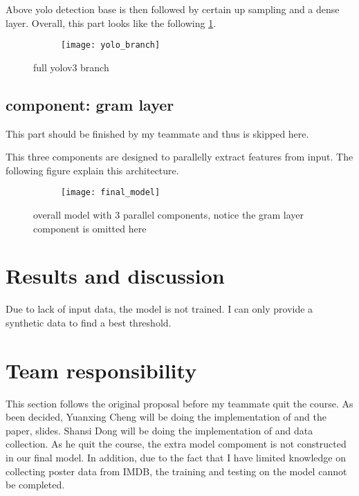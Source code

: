 \documentclass{article}
\begin{document}
Above yolo detection base is then followed by certain up sampling and a dense layer. Overall, this part looks like the following \ref{pic:overall_model}.

\begin{figure}[h!]
    \centering
    \begin{subfigure}{.70\textwidth}
        \centering
        \texttt{[image: yolo\_branch]}
    \end{subfigure}
    \caption{full yolov3 branch}\label{pic:overall_model}
\end{figure}


\subsection{component: gram layer}

This part should be finished by my teammate and thus is skipped here.

This three components are designed to parallelly extract features from input. The following figure explain this architecture.

\begin{figure}[h!]
    \centering
    \begin{subfigure}{.88\textwidth}
        \centering
        \texttt{[image: final\_model]}
    \end{subfigure}
    \caption{overall model with 3 parallel components, notice the gram layer component is omitted here}
\end{figure}


\section{Results and discussion}

Due to lack of input data, the model is not trained. I can only provide a synthetic data to find a best threshold.

\section{Team responsibility}

This section follows the original proposal before my teammate quit the course. As been decided, Yuanxing Cheng will be doing the implementation of \cite{chu2017movie} and the paper, slides. Shansi Dong will be doing the implementation of \cite{wi_poster-based_2020} and data collection. As he quit the course, the extra model compoment is not constructed in our final model. In addition, due to the fact that I have limited knowledge on collecting poster data from IMDB, the training and testing on the model cannot be completed.


\newpage

\newpage


\end{document}
